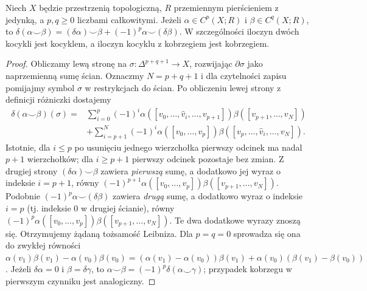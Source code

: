 \begin{stwierdzenie}
Niech $X$ będzie przestrzenią topologiczną, $R$ przemiennym
pierścieniem z jedynką, a $p,q\geq0$ liczbami całkowitymi.
Jeżeli $\alpha\in C^p(X;R)$ i $\beta\in C^q(X;R)$, to
$\delta(\alpha\smile\beta)
=(\delta\alpha)\smile\beta+(-1)^p\alpha\smile(\delta\beta)$.
W szczególności iloczyn dwóch kocykli jest kocyklem,
a iloczyn kocyklu z kobrzegiem jest kobrzegiem.
\end{stwierdzenie}
\begin{proof}
Obliczamy lewą stronę na $\sigma:\Delta^{p+q+1}\to X$,
rozwijając $\partial\sigma$ jako naprzemienną sumę ścian.
Oznaczmy $N=p+q+1$ i dla czytelności zapisu pomijajmy
symbol $\sigma$ w restrykcjach do ścian.
Po obliczeniu lewej strony z definicji różniczki dostajemy
\[
\begin{aligned}
\delta(\alpha\smile\beta)(\sigma)
={}&\sum_{i=0}^{p}(-1)^i
 \alpha([v_0,\ldots,\widehat v_i,\ldots,v_{p+1}])
 \beta([v_{p+1},\ldots,v_N])\\
&+\sum_{i=p+1}^{N}(-1)^i
 \alpha([v_0,\ldots,v_p])
 \beta([v_p,\ldots,\widehat v_i,\ldots,v_N]).
\end{aligned}
\]
Istotnie, dla $i\leq p$ po usunięciu jednego
wierzchołka pierwszy odcinek ma nadal $p+1$ wierzchołków;
dla $i\geq p+1$ pierwszy odcinek pozostaje bez zmian.
Z drugiej strony $(\delta\alpha)\smile\beta$
zawiera \emph{pierwszą} sumę, a dodatkowo jej wyraz
o indeksie $i=p+1$, równy
$(-1)^{p+1}\alpha([v_0,\ldots,v_p])
\beta([v_{p+1},\ldots,v_N])$.
Podobnie $(-1)^p\alpha\smile(\delta\beta)$
zawiera \emph{drugą} sumę, a dodatkowo wyraz
o indeksie $i=p$ (tj. indeksie $0$ w drugiej ścianie),
równy
$(-1)^p\alpha([v_0,\ldots,v_p])
\beta([v_{p+1},\ldots,v_N])$.
Te dwa dodatkowe wyrazy znoszą się.
Otrzymujemy żądaną tożsamość Leibniza.
Dla $p=q=0$ sprowadza się ona do zwykłej równości
$\alpha(v_1)\beta(v_1)-\alpha(v_0)\beta(v_0)
=(\alpha(v_1)-\alpha(v_0))\beta(v_1)
+\alpha(v_0)(\beta(v_1)-\beta(v_0))$.
Jeżeli $\delta\alpha=0$ i $\beta=\delta\gamma$, to
$\alpha\smile\beta=(-1)^p\delta(\alpha\smile\gamma)$;
przypadek kobrzegu w pierwszym czynniku jest analogiczny.
\end{proof}

